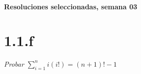 \documentclass[10pt,a4paper]{article}
\begin{document}
\vspace{0,3cm}

\begin{center}
{\bf \Large Resoluciones seleccionadas, semana 03}
\end{center}


\vspace{0,3cm}

\section*{1.1.f}\emph{Probar $\sum_{i=1}^n i(i!)= (n + 1)! - 1$}
\end{document}
